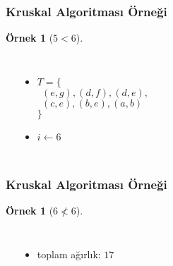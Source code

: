 \documentclass[dvipsnames]{beamer}
\theoremstyle{definition}
\theoremstyle{example}
\newtheorem{ornek}[theorem]{Örnek}
\theoremstyle{plain}
\begin{document}
\begin{frame}
  \frametitle{Kruskal Algoritması Örneği}

  \begin{ornek}[$5 < 6$]
    \begin{columns}
      \begin{center}
      \end{center}

      \pause
      \begin{itemize}
        \item $T = \{$\\
          $~~(e,g), (d,f), (d,e),$\\
          $~~(c,e), (b,e), (a,b)$\\
          $\}$
        \item $i \leftarrow 6$
      \end{itemize}
    \end{columns}
  \end{ornek}
\end{frame}

\begin{frame}
  \frametitle{Kruskal Algoritması Örneği}

  \begin{ornek}[$6 \nless 6$]
    \begin{columns}
      \begin{center}
      \end{center}

      \begin{itemize}
        \item toplam ağırlık: $17$
      \end{itemize}
    \end{columns}
  \end{ornek}
\end{frame}
\end{document}
